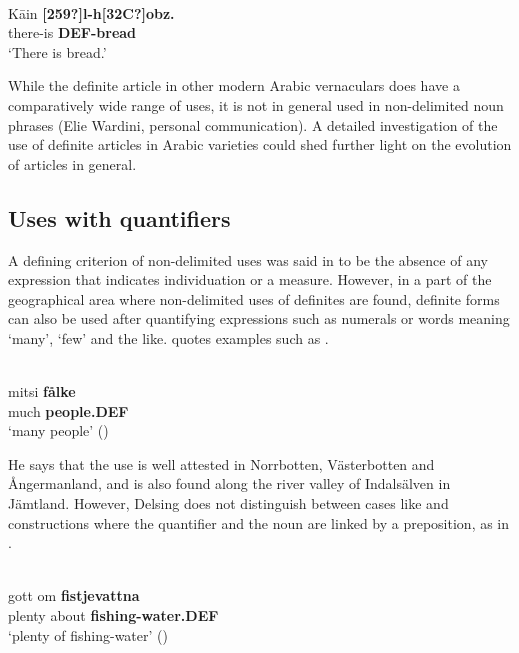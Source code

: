 \ea
{}\\
\gll K\=ain  \textbf{[259?]l-h[32C?]obz.} \\
there-is  \textbf{DEF-bread}\\
\glt ‘There is bread.’

\z

While the definite article in other modern Arabic vernaculars does have a comparatively wide range of uses, it is not in general used in non-delimited noun phrases (Elie Wardini, personal communication). A detailed investigation of the use of definite articles in Arabic varieties could shed further light on the evolution of articles in general.

\subsection{ Uses with quantifiers}
\label{bkm:Ref114303795}

A defining criterion of non-delimited uses was said in  to be the absence of any expression that indicates individuation or a measure. However, in a part of the geographical area where non-delimited uses of definites are found, definite forms can also be used after quantifying expressions such as numerals or words meaning ‘many’, ‘few’ and the like. \citet{Delsing2003a} quotes examples such as .

\ea \label{} 
\\
\gll mitsi  \textbf{fålke}\\
much  \textbf{people.DEF}\\
\glt ‘many people’ (\citet[17]{Delsing2003a})

\z

He says that the use is well attested in Norrbotten, Västerbotten and Ångermanland, and is also found along the river valley of Indalsälven in Jämtland. However, Delsing does not distinguish between cases like  and constructions where the quantifier and the noun are linked by a preposition, as in .

\ea \label{} 
\\
\gll gott  om  \textbf{fistjevattna} \\
plenty  about  \textbf{fishing-water.DEF} \\
\glt ‘plenty of fishing-water’ (\citet[18]{Delsing2003a})

\z

